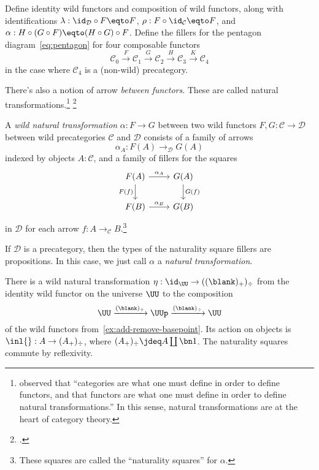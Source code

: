 \begin{xca}
  Define identity wild functors and composition of wild functors,
  along with identifications $\lambda : \id_{\mathcal D}\circ F \eqto F$,
  $\rho : F \circ \id_{\mathcal C} \eqto F$,
  and $\alpha : H\circ (G \circ F) \eqto (H \circ G)\circ F$.
  Define the fillers for the pentagon diagram~\eqref{eq:pentagon}
  for four composable functors
  \[
    \mathcal C_0 \xrightarrow F
    \mathcal C_1 \xrightarrow G
    \mathcal C_2 \xrightarrow H
    \mathcal C_3 \xrightarrow K
    \mathcal C_4
  \]
  in the case where $\mathcal C_4$ is a (non-wild) precategory.
\end{xca}
There's also a notion of arrow \emph{between functors}.
These are called natural transformations.\footnote{%
  \citeauthor{Freyd1964}\footnotemark{} observed that ``categories are what one must define
  in order to define functors, and that functors are what one must define
  in order to define natural transformations.''
  In this sense, natural transformations are at the heart of category theory.}%
\footcitetext{Freyd1964}
\begin{definition}
  A \emph{wild natural transformation}
  $\alpha : F \to G$ between
  two wild functors $F,G : \mathcal C \to \mathcal D$ between
  wild precategories $\mathcal C$ and $\mathcal D$
  consists of a family of arrows
  \[
    \alpha_A : F(A) \to_{\mathcal D} G(A)
  \]
  indexed by objects $A:\mathcal C$,
  and a family of fillers for the squares
  \[
    \begin{tikzcd}
      F(A) \ar[r,"\alpha_A"]\ar[d,"F(f)"'] & G(A) \ar[d,"G(f)"] \\
      F(B) \ar[r,"\alpha_B"] & G(B)
    \end{tikzcd}
  \]
  in $\mathcal D$
  for each arrow $f : A \to_{\mathcal C} B$.\footnote{%
    These squares are called the ``naturality squares'' for $\alpha$.}

  If $\mathcal D$ is a precategory, then the types of the naturality square fillers
  are propositions. In this case, we just call $\alpha$ a \emph{natural transformation}.
\end{definition}
\begin{example}
  There is a wild
  natural transformation $\eta : \id_{\UU} \to ((\blank)_+)_\div$
  from the identity wild functor on the universe $\UU$
  to the composition
  \[
    \UU \xrightarrow{(\blank)_+} \UUp \xrightarrow{(\blank)_\div} \UU
  \]
  of the wild functors from~\cref{ex:add-remove-basepoint}.
  Its action on objects is $\inl{} : A \to (A_+)_\div$,
  where $(A_+)_\div \jdeq A \coprod\bn 1$.
  The naturality squares commute by reflexivity.
\end{example}

